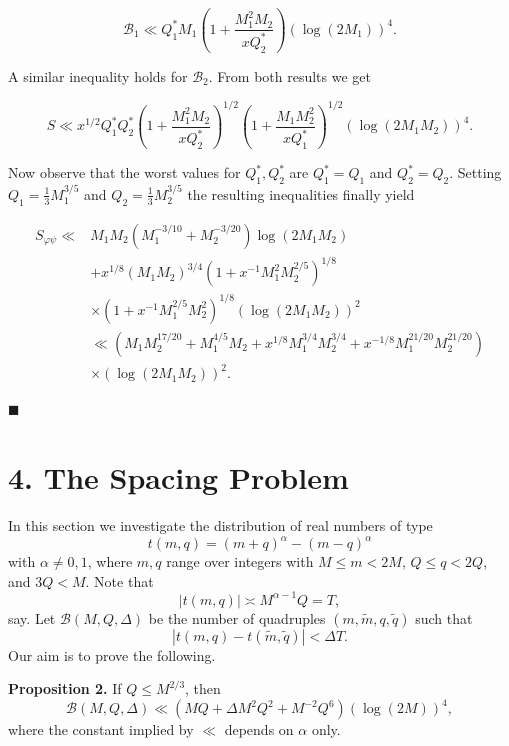 \documentclass[10pt]{article}
\begin{document}
$$
\mathscr{B}_{1} \ll Q_{1}^{*} M_{1}\left(1+\frac{M_{1}^{2} M_{2}}{x Q_{2}^{*}}\right)\left(\log(2 M_{1})\right)^{4} .
$$

A similar inequality holds for $\mathscr{B}_{2}$. From both results we get

$$
S \ll x^{1 / 2} Q_{1}^{*} Q_{2}^{*}\left(1+\frac{M_{1}^{2} M_{2}}{x Q_{2}^{*}}\right)^{1 / 2}\left(1+\frac{M_{1} M_{2}^{2}}{x Q_{1}^{*}}\right)^{1 / 2}\left(\log\left(2 M_{1} M_{2}\right)\right)^{4} .
$$

Now observe that the worst values for $Q_{1}^{*}, Q_{2}^{*}$ are $Q_{1}^{*}=Q_{1}$ and $Q_{2}^{*}=Q_{2}$. Setting $Q_{1}=\frac{1}{3} M_{1}^{3 / 5}$ and $Q_{2}=\frac{1}{3} M_{2}^{3 / 5}$ the resulting inequalities finally yield

$$
\begin{aligned}
S_{\varphi \psi} \ll & M_{1} M_{2}\left(M_{1}^{-3 / 10}+M_{2}^{-3 / 20}\right) \log\left(2 M_{1} M_{2}\right) \\
& +x^{1 / 8}\left(M_{1} M_{2}\right)^{3 / 4}\left(1+x^{-1} M_{1}^{2} M_{2}^{2 / 5}\right)^{1 / 8} \\
& \times\left(1+x^{-1} M_{1}^{2 / 5} M_{2}^{2}\right)^{1 / 8}\left(\log\left(2 M_{1} M_{2}\right)\right)^{2} \\
& \ll\left(M_{1} M_{2}^{17 / 20}+M_{1}^{4 / 5} M_{2}+x^{1 / 8} M_{1}^{3 / 4} M_{2}^{3 / 4}+x^{-1 / 8} M_{1}^{21 / 20} M_{2}^{21 / 20}\right) \\
& \times\left(\log\left(2 M_{1} M_{2}\right)\right)^{2} .
\end{aligned}
$$

\(\blacksquare\)

\section*{4. The Spacing Problem}

In this section we investigate the distribution of real numbers of type
\[
  t(m,q)=(m+q)^\alpha-(m-q)^\alpha
\]
with $\alpha\ne0,1$, where $m,q$ range over integers with
$M\le m<2M$, $Q\le q<2Q$, and $3Q<M$. Note that
\[
  |t(m,q)|\asymp M^{\alpha-1}Q=T,
\]
say. Let $\mathscr B(M,Q,\Delta)$ be the number of quadruples
$(m,\widetilde m,q,\widetilde q)$ such that
\begin{equation*}
  |t(m,q)-t(\widetilde m,\widetilde q)|<\Delta T.
  \tag{4.1}
\end{equation*}
Our aim is to prove the following.

\medskip
\noindent\textbf{Proposition 2.}
If $Q\le M^{2/3}$, then
\begin{equation*}
  \mathscr B(M,Q,\Delta)
  \ll\left(MQ+\Delta M^2Q^2+M^{-2}Q^6\right)(\log(2M))^4,
  \tag{4.2}
\end{equation*}
where the constant implied by $\ll$ depends on $\alpha$ only.
\end{document}
